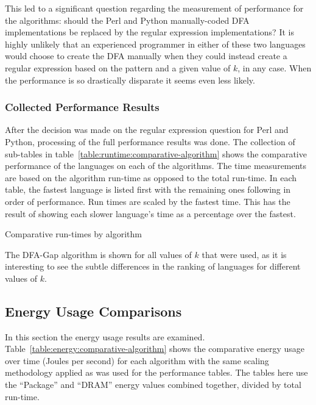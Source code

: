 This led to a significant question regarding the measurement of performance for the algorithms: should the Perl and Python manually-coded DFA implementations be replaced by the regular expression implementations? It is highly unlikely that an experienced programmer in either of these two languages would choose to create the DFA manually when they could instead create a regular expression based on the pattern and a given value of $k$, in any case. When the performance is so drastically disparate it seems even less likely.

\subsubsection{Collected Performance Results}

After the decision was made on the regular expression question for Perl and Python, processing of the full performance results was done. The collection of sub-tables in table~\ref{table:runtime:comparative-algorithm} shows the comparative performance of the languages on each of the algorithms. The time measurements are based on the algorithm run-time as opposed to the total run-time. In each table, the fastest language is listed first with the remaining ones following in order of performance. Run times are scaled by the fastest time. This has the result of showing each slower language's time as a percentage over the fastest.

\begin{table}[!htb]

\caption{Comparative run-times by algorithm}
\label{table:runtime:comparative-algorithm}
\end{table}

The DFA-Gap algorithm is shown for all values of $k$ that were used, as it is interesting to see the subtle differences in the ranking of languages for different values of $k$.

\subsection{Energy Usage Comparisons}
\label{subsec:energy_comp}

In this section the energy usage results are examined. Table~\ref{table:energy:comparative-algorithm} shows the comparative energy usage over time (Joules per second) for each algorithm with the same scaling methodology applied as was used for the performance tables. The tables here use the ``Package'' and ``DRAM'' energy values combined together, divided by total run-time.

